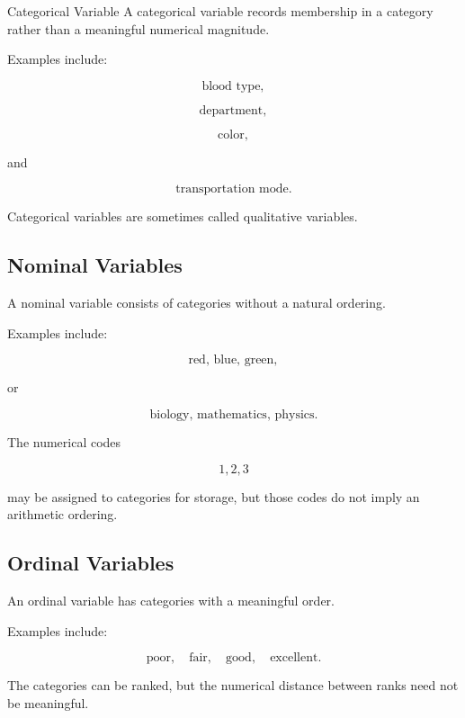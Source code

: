 \begin{definitionbox}{Categorical Variable}
A categorical variable records membership in a category rather than a
meaningful numerical magnitude.
\end{definitionbox}

Examples include:

\[
\text{blood type},
\]

\[
\text{department},
\]

\[
\text{color},
\]

and

\[
\text{transportation mode}.
\]

Categorical variables are sometimes called qualitative variables.

\subsection{Nominal Variables}
\label{subsec:nominal-variables}

A nominal variable consists of categories without a natural ordering.

Examples include:

\[
\text{red, blue, green},
\]

or

\[
\text{biology, mathematics, physics}.
\]

The numerical codes

\[
1,2,3
\]

may be assigned to categories for storage, but those codes do not imply
an arithmetic ordering.

\subsection{Ordinal Variables}
\label{subsec:ordinal-variables}

An ordinal variable has categories with a meaningful order.

Examples include:

\[
\text{poor},
\quad
\text{fair},
\quad
\text{good},
\quad
\text{excellent}.
\]

The categories can be ranked, but the numerical distance between ranks
need not be meaningful.

